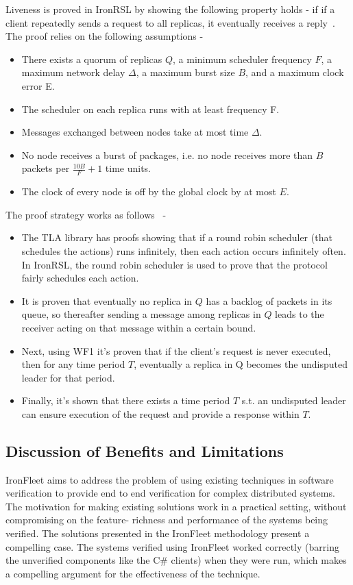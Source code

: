 \documentclass{llncs}
\begin{document}
Liveness is proved in IronRSL by showing the following property holds - if if a client repeatedly
sends a request to all replicas, it eventually receives
a reply~\cite{ironfleet}. The proof relies on the following assumptions - 
\begin{itemize} 
    \item There exists a quorum of replicas $Q$, a
        minimum scheduler frequency $F$, a maximum network delay
        $\Delta$, a maximum burst size $B$, and a maximum clock error E.
    \item The scheduler on each replica runs with at least frequency F.
    \item Messages exchanged between nodes take at most time $\Delta$.
    \item No node receives a burst of packages, i.e. no node receives more
          than $B$ packets per $\frac{10B}{F} + 1$ time units.
    \item The clock of every node is off by the global clock by at most $E$.
\end{itemize}

The proof strategy works as follows~\cite{ironfleet} - 
\begin{itemize}
    \item The TLA library has proofs showing that if a round robin scheduler (that 
        schedules the actions) runs infinitely, then each action occurs
        infinitely often. In IronRSL, the round robin scheduler is used to prove that
        the protocol fairly schedules each action.
    \item It is proven that eventually no replica in $Q$ 
        has a backlog of packets in its queue, so
        thereafter sending a message among replicas in $Q$ leads to
        the receiver acting on that message within a certain bound.
    \item Next, using WF1 it's proven that if the client’s request
        is never executed, then for any time period $T$, eventually a
        replica in Q becomes the undisputed leader for that period.
    \item Finally, it's shown that there exists a time period $T$ s.t. 
        an undisputed leader can ensure execution of the request and 
        provide a response within $T$.
\end{itemize}

\subsection{Discussion of Benefits and Limitations}
IronFleet aims to address the problem of using existing techniques in software verification
to provide end to end verification for complex distributed systems. The motivation for 
making existing solutions work in a practical setting, without compromising on the feature-
richness and performance of the systems being verified. The solutions presented in the IronFleet
methodology present a compelling case. The systems verified using IronFleet worked correctly (barring
the unverified components like the C\# clients)
when they were run, which makes a compelling argument for the effectiveness of the technique.
\end{document}
